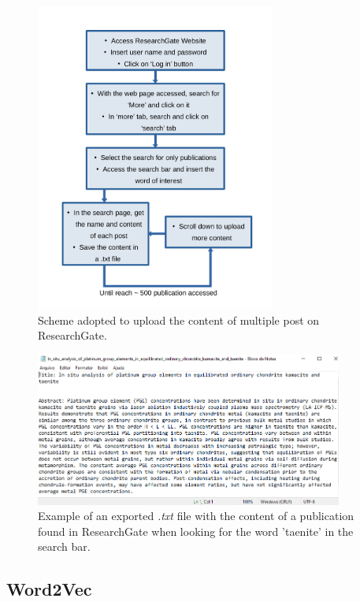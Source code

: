 \documentclass{article}
\begin{document}
\begin{figure}[h!]
    \centering
    \includegraphics[width=0.7\textwidth]{images/sem_titulo_1.pdf}
    \caption{Scheme adopted to upload the content of multiple post on ResearchGate.}
    \label{fig:organogram}
\end{figure}

\begin{figure}[h!]
    \centering
    \includegraphics[width=0.9\textwidth]{images/captura_de_tela_2021-01-12_085048.png}
    \caption{Example of an exported \textit{.txt} file with the content of a publication found in ResearchGate when looking for the word 'taenite' in the search bar.}
    \label{fig:txt}
\end{figure}

\subsection{Word2Vec}
\end{document}
